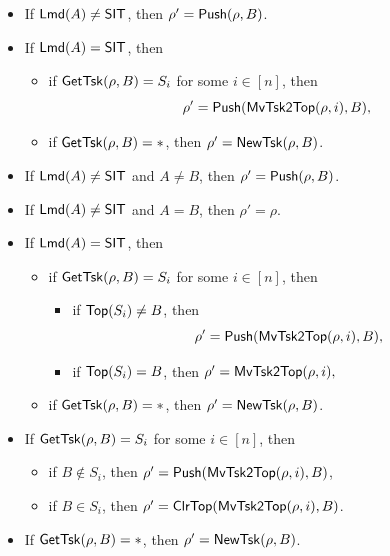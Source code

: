 	\begin{itemize}
		\item If ${\sf Lmd}(A) \neq \mathsf{SIT}$, then $\rho'= \mathsf{Push}(\rho,B)$.
		\item If ${\sf Lmd}(A) = \mathsf{SIT}$, then
    		\begin{itemize}
    			\item if $\mathsf{GetTsk}(\rho, B)=S_i$ for some $i\in[n]$,  then 
			$$\rho'=\mathsf{Push}(\mathsf{MvTsk2Top}(\rho, i),B),$$
    			\item if $\mathsf{GetTsk}(\rho, B)=*$, then $\rho'= \mathsf{NewTsk}(\rho,B )$.
    		\end{itemize}
	\end{itemize}
	
	
%	
	

\noindent {}
	\begin{itemize}
		\item  If ${\sf Lmd}(A) \neq \mathsf{SIT}$ and $A \neq B$, then $\rho' = \mathsf{Push}(\rho,B)$.
		\item  If ${\sf Lmd}(A) \neq \mathsf{SIT}$ and $A = B$, then $\rho' =  \rho$.
		\item If ${\sf Lmd}(A) = \mathsf{SIT}$, then
    		\begin{itemize}
    			\item if $\mathsf{GetTsk}(\rho, B)=S_i$ for some $i\in[n]$,  then
                \begin{itemize}
                    \item if $\mathsf{Top}(S_i)\neq B$, then 
                    $$\rho'=\mathsf{Push}(\mathsf{MvTsk2Top}(\rho, i),B),$$
                    \item if $\mathsf{Top}(S_i)= B$, then $\rho'=\mathsf{MvTsk2Top}(\rho, i),$
                \end{itemize}
    			\item if $\mathsf{GetTsk}(\rho, B)=*$, then $\rho'= \mathsf{NewTsk}(\rho,B )$.
    		\end{itemize}
	 \end{itemize}
	
\noindent {}
\begin{itemize}
	\item If $\mathsf{GetTsk}(\rho, B) = S_i$ for some $i\in[n]$, then
	\begin{itemize}
        \item if $B \not \in S_i$, then $\rho' = \mathsf{Push}(\mathsf{MvTsk2Top}(\rho, i), B)$,
        \item if $B  \in S_i$, 	then $\rho' =  \mathsf{ClrTop}(\mathsf{MvTsk2Top}(\rho, i), B)$.
	\end{itemize}
\item If $\mathsf{GetTsk}(\rho, B) = *$, then $\rho' = \mathsf{NewTsk}(\rho, B)$.
\end{itemize}


